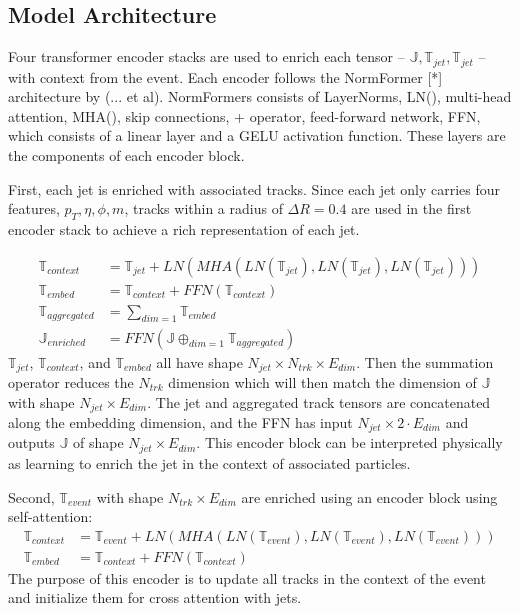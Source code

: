 \iffalse
\subsection{Model Architecture}\hfill

Four transformer encoder stacks are used to enrich each tensor -- $\mathbb{J},\mathbb{T}_{jet},\mathbb{T}_{jet}$ -- with context from the event. Each encoder follows the NormFormer [*] architecture by (... et al). NormFormers consists of LayerNorms, LN(), multi-head attention, MHA(), skip connections, + operator, feed-forward network, FFN, which consists of a linear layer and a GELU activation function. These layers are the components of each encoder block.


First, each jet is enriched with associated tracks. Since each jet only carries four features, $p_T, \eta, \phi, m$, tracks within a radius of $\Delta R = 0.4$ are used in the first encoder stack to achieve a rich representation of each jet.

\begin{align}
    \mathbb{T}_{context} &= \mathbb{T}_{jet} + LN(MHA(LN(\mathbb{T}_{jet}), LN(\mathbb{T}_{jet}), LN(\mathbb{T}_{jet}))) \\
    \mathbb{T}_{embed} &= \mathbb{T}_{context} + FFN (\mathbb{T}_{context}) \\
    \mathbb{T}_{aggregated} &= \sum_{dim=1} \mathbb{T}_{embed} \\ 
    \mathbb{J}_{enriched} &= FFN(\mathbb{J} \mathop{\oplus}_{dim=1} \mathbb{T}_{aggregated})
\end{align}
$\mathbb{T}_{jet}$, $\mathbb{T}_{context}$, and $\mathbb{T}_{embed}$ all have shape $N_{jet} \times N_{trk} \times E_{dim}$. Then the summation operator reduces the $N_{trk}$ dimension which will then match the dimension of $\mathbb{J}$ with shape $N_{jet} \times E_{dim}$. The jet and aggregated track tensors are concatenated along the embedding dimension, and the FFN has input $N_{jet} \times 2\cdot E_{dim}$ and outputs $\mathbb{J}$ of shape $N_{jet} \times E_{dim}$. This encoder block can be interpreted physically as learning to enrich the jet in the context of associated particles. %

Second, $\mathbb{T}_{event}$ with shape $N_{trk} \times E_{dim}$ are enriched using an encoder block using self-attention:
\begin{align}
    \mathbb{T}_{context} &= \mathbb{T}_{event} + LN(MHA(LN(\mathbb{T}_{event}), LN(\mathbb{T}_{event}), LN(\mathbb{T}_{event}))) \\
    \mathbb{T}_{embed} &= \mathbb{T}_{context} + FFN (\mathbb{T}_{context})
\end{align}
The purpose of this encoder is to update all tracks in the context of the event and initialize them for cross attention with jets.

